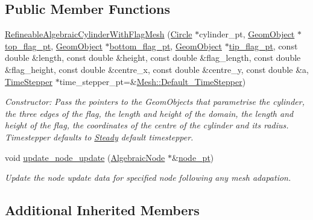 \subsection*{Public Member Functions}
\begin{DoxyCompactItemize}
\item 
\hyperlink{classoomph_1_1RefineableAlgebraicCylinderWithFlagMesh_a9ddd203e89075036bfdfe6b695fb3395}{Refineable\+Algebraic\+Cylinder\+With\+Flag\+Mesh} (\hyperlink{classoomph_1_1Circle}{Circle} $\ast$cylinder\+\_\+pt, \hyperlink{classoomph_1_1GeomObject}{Geom\+Object} $\ast$\hyperlink{classoomph_1_1AlgebraicCylinderWithFlagMesh_a06bc13adad4aaa037d989bba9e3bf79d}{top\+\_\+flag\+\_\+pt}, \hyperlink{classoomph_1_1GeomObject}{Geom\+Object} $\ast$\hyperlink{classoomph_1_1AlgebraicCylinderWithFlagMesh_a9c362fcc5edeb1b6e773f27a83778495}{bottom\+\_\+flag\+\_\+pt}, \hyperlink{classoomph_1_1GeomObject}{Geom\+Object} $\ast$\hyperlink{classoomph_1_1AlgebraicCylinderWithFlagMesh_ad6d22aaa02d79e3c740b06d98a1597ea}{tip\+\_\+flag\+\_\+pt}, const double \&length, const double \&height, const double \&flag\+\_\+length, const double \&flag\+\_\+height, const double \&centre\+\_\+x, const double \&centre\+\_\+y, const double \&a, \hyperlink{classoomph_1_1TimeStepper}{Time\+Stepper} $\ast$time\+\_\+stepper\+\_\+pt=\&\hyperlink{classoomph_1_1Mesh_a12243d0fee2b1fcee729ee5a4777ea10}{Mesh\+::\+Default\+\_\+\+Time\+Stepper})
\begin{DoxyCompactList}\small\item\em Constructor\+: Pass the pointers to the Geom\+Objects that parametrise the cylinder, the three edges of the flag, the length and height of the domain, the length and height of the flag, the coordinates of the centre of the cylinder and its radius. Timestepper defaults to \hyperlink{classoomph_1_1Steady}{Steady} default timestepper. \end{DoxyCompactList}\item 
void \hyperlink{classoomph_1_1RefineableAlgebraicCylinderWithFlagMesh_a186963cf4b1fc118929e49e012eba4d2}{update\+\_\+node\+\_\+update} (\hyperlink{classoomph_1_1AlgebraicNode}{Algebraic\+Node} $\ast$\&\hyperlink{classoomph_1_1AlgebraicMesh_aedeebbe95d2f8e67e9939cecd1be3933}{node\+\_\+pt})
\begin{DoxyCompactList}\small\item\em Update the node update data for specified node following any mesh adapation. \end{DoxyCompactList}\end{DoxyCompactItemize}
\subsection*{Additional Inherited Members}


